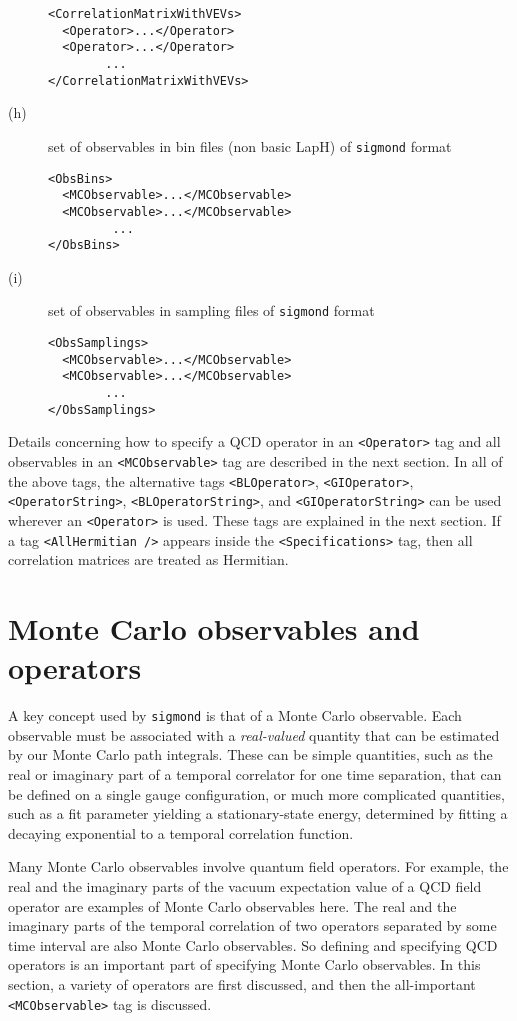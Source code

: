 \documentclass[12pt]{article}
\newcommand{\vb}{\texttt}
\begin{document}
\begin{description}
\begin{verbatim}
<CorrelationMatrixWithVEVs>
  <Operator>...</Operator>
  <Operator>...</Operator>
        ... 
</CorrelationMatrixWithVEVs>
\end{verbatim}
\item[(h)]
 set of observables in bin files (non basic LapH) of \vb{sigmond} format
\begin{verbatim}
<ObsBins>
  <MCObservable>...</MCObservable>
  <MCObservable>...</MCObservable>
         ...
</ObsBins>
\end{verbatim}
\item[(i)]
 set of observables in sampling files of \vb{sigmond} format
\begin{verbatim}
<ObsSamplings>
  <MCObservable>...</MCObservable>
  <MCObservable>...</MCObservable>
        ... 
</ObsSamplings>
\end{verbatim}
\end{description}

Details concerning how to specify a QCD operator in an \vb{<Operator>}
tag and all observables in an \vb{<MCObservable>} tag are described in the
next section.  In all of the above tags, the alternative tags \vb{<BLOperator>}, 
\vb{<GIOperator>}, \vb{<OperatorString>}, \vb{<BLOperatorString>}, and
\vb{<GIOperatorString>} can be used wherever an \vb{<Operator>} is used.
These tags are explained in the next section.
If a tag \vb{<AllHermitian />} appears inside the \vb{<Specifications>}
tag, then all correlation matrices are treated as Hermitian.

\section{Monte Carlo observables and operators}

A key concept used by \vb{sigmond} is that of a Monte Carlo observable.
Each observable must be associated with a \textit{real-valued} quantity that 
can be estimated by our Monte Carlo path integrals.  These can be simple 
quantities, such as the real or imaginary part of a temporal correlator for
one time separation, that can be defined on a single gauge configuration, 
or much more complicated quantities, such as a fit parameter yielding a
stationary-state energy, determined by fitting a decaying exponential to a 
temporal correlation function. 

Many Monte Carlo observables involve quantum field operators.  For example,
the real and the imaginary parts of the vacuum expectation value of a QCD
field operator are examples of Monte Carlo observables here.  The real
and the imaginary parts of the temporal correlation of two operators 
separated by some time interval are also Monte Carlo observables.  So
defining and specifying QCD operators is an important part of specifying
Monte Carlo observables.  In this section, a variety of operators are
first discussed, and then the all-important \vb{<MCObservable>} tag is
discussed.
\end{document}
